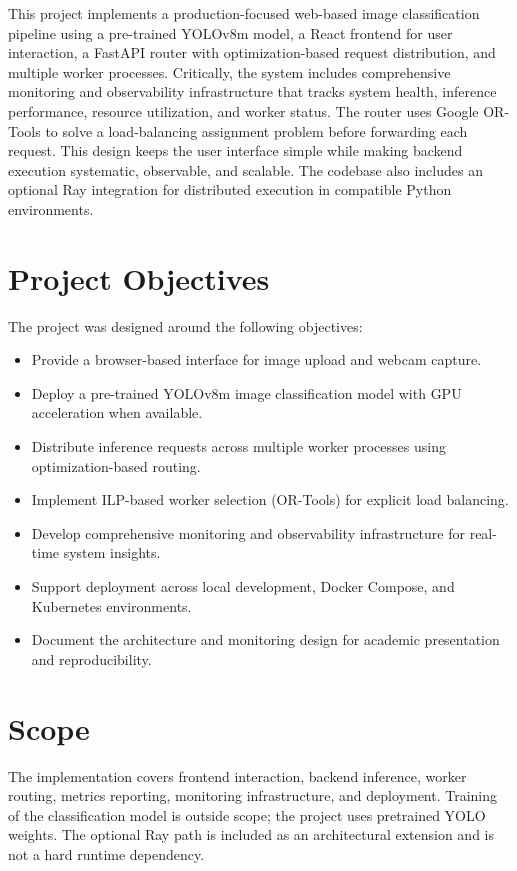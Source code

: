 \documentclass[12pt,a4paper]{report}
\begin{document}
This project implements a production-focused web-based image classification pipeline using a pre-trained YOLOv8m model, a React frontend for user interaction, a FastAPI router with optimization-based request distribution, and multiple worker processes. Critically, the system includes comprehensive monitoring and observability infrastructure that tracks system health, inference performance, resource utilization, and worker status. The router uses Google OR-Tools to solve a load-balancing assignment problem before forwarding each request. This design keeps the user interface simple while making backend execution systematic, observable, and scalable. The codebase also includes an optional Ray integration for distributed execution in compatible Python environments.

\section{Project Objectives}
The project was designed around the following objectives:
\begin{itemize}
  \item Provide a browser-based interface for image upload and webcam capture.
  \item Deploy a pre-trained YOLOv8m image classification model with GPU acceleration when available.
  \item Distribute inference requests across multiple worker processes using optimization-based routing.
  \item Implement ILP-based worker selection (OR-Tools) for explicit load balancing.
  \item Develop comprehensive monitoring and observability infrastructure for real-time system insights.
  \item Support deployment across local development, Docker Compose, and Kubernetes environments.
  \item Document the architecture and monitoring design for academic presentation and reproducibility.
\end{itemize}

\section{Scope}
The implementation covers frontend interaction, backend inference, worker routing, metrics reporting, monitoring infrastructure, and deployment. Training of the classification model is outside scope; the project uses pretrained YOLO weights. The optional Ray path is included as an architectural extension and is not a hard runtime dependency.
\end{document}
